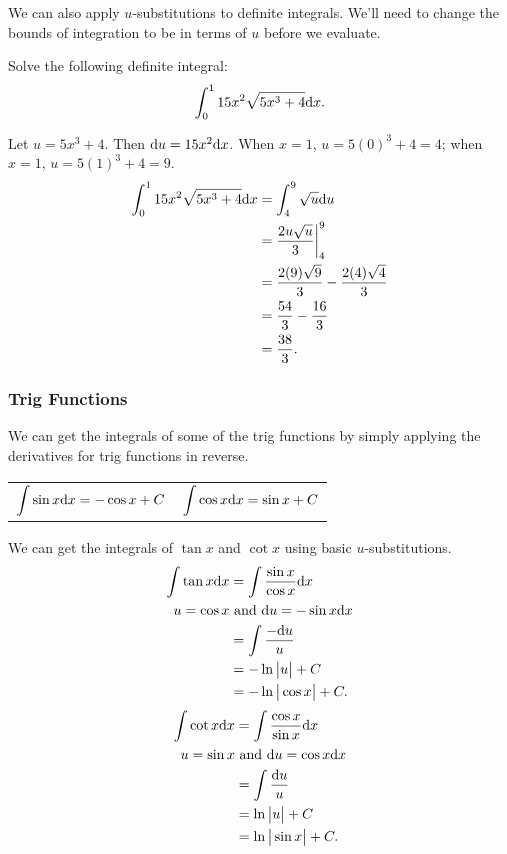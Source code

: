 We can also apply $u$-substitutions to definite integrals.
We'll need to change the bounds of integration to be in terms of $u$ before we evaluate.
\begin{example}
	Solve the following definite integral:
	\begin{equation*}
		\int_{0}^{1}{15x^2\sqrt{5x^3+4}\mathrm{d} x}.
	\end{equation*}
\end{example}
\begin{answer}
	Let $u = 5x^3 + 4$.
	Then $\mathrm{d} u = 15x^2\mathrm{d} x$.
	When $x=1$, $u=5(0)^3 + 4 = 4$; when $x=1$, $u = 5(1)^3  +4 = 9$.
	\begin{align*}
		\int_{0}^{1}{15x^2\sqrt{5x^3+4}\mathrm{d} x} &= \int_{4}^{9}{\sqrt{u}\mathrm{d} u} \\
		&= \frac{2u\sqrt{u}}{3} \biggr\rvert_{4}^{9} \\
		&= \frac{2(9)\sqrt{9}}{3} - \frac{2(4)\sqrt{4}}{3} \\
		&= \frac{54}{3} - \frac{16}{3} \\
		&= \frac{38}{3}.
	\end{align*}
\end{answer}

\subsubsection{Trig Functions}
We can get the integrals of some of the trig functions by simply applying the derivatives for trig functions in reverse.
\begin{table}[H]
	\begin{center}
		\begin{tabular}{ l l }
			$\begin{aligned}\int{\sin{x}\mathrm{d} x}=-\cos{x} + C\end{aligned}$ & $\begin{aligned}\int{\cos{x}\mathrm{d} x}=\sin{x}+C\end{aligned}$
		\end{tabular}
	\end{center}
\end{table}


We can get the integrals of $\tan{x}$ and $\cot{x}$ using basic $u$-substitutions.
\begin{align*}
	\int{\tan{x}\mathrm{d} x} &= \int{\frac{\sin{x}}{\cos{x}}\mathrm{d} x} \\
	u = \cos{x} &\text{ and } \mathrm{d} u = -\sin{x}\mathrm{d} x \\
	&= \int{\frac{-\mathrm{d} u}{u}} \\
	&= -\ln{\big\lvert u \big\rvert} + C \\
	&= -\ln{\big\lvert \cos{x} \big\rvert} + C.
\end{align*}
\begin{align*}
	\int{\cot{x}\mathrm{d} x} &= \int{\frac{\cos{x}}{\sin{x}}\mathrm{d} x} \\
	u = \sin{x} &\text{ and } \mathrm{d} u = \cos{x}\mathrm{d} x \\
	&= \int{\frac{\mathrm{d} u}{u}} \\
	&= \ln{\big\lvert u \big\rvert} + C \\
	&= \ln{\big\lvert \sin{x} \big\rvert} + C.
\end{align*}


